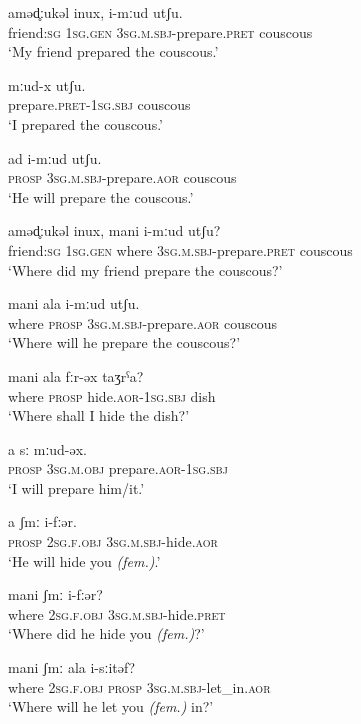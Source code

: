 \documentclass[14pt]{extarticle}
\newcommand{\SG}{\textsc{sg}}
\newcommand{\M}{\textsc{m}}
\newcommand{\F}{\textsc{f}}
\newcommand{\PROSP}{\textsc{prosp}}
\newcommand{\SBJ}{\textsc{sbj}}
\newcommand{\OBJ}{\textsc{obj}}
\newcommand{\GEN}{\textsc{gen}}
\newcommand{\AOR}{\textsc{aor}}
\newcommand{\PRET}{\textsc{pret}}
\begin{document}
\begin{exe}
\ex
\gll aməd̥ːukəl inux, i-mːud utʃu.\\
friend:{\SG} 1{\SG}.{\GEN} 3{\SG}.{\M}.{\SBJ}-prepare.{\PRET} couscous\\
\glt `My friend prepared the couscous.'

\ex
\gll mːud-x utʃu.\\
prepare.{\PRET}-1{\SG}.{\SBJ} couscous\\
\glt `I prepared the couscous.'

\ex
\gll ad i-mːud utʃu.\\
{\PROSP} 3{\SG}.{\M}.{\SBJ}-prepare.{\AOR} couscous\\
\glt `He will prepare the couscous.'

\ex
\gll aməd̥ːukəl inux, mani i-mːud utʃu?\\
friend:{\SG} 1{\SG}.{\GEN} where 3{\SG}.{\M}.{\SBJ}-prepare.{\PRET} couscous\\
\glt `Where did my friend prepare the couscous?'

\ex
\gll mani ala i-mːud utʃu.\\
where {\PROSP} 3{\SG}.{\M}.{\SBJ}-prepare.{\AOR} couscous\\
\glt `Where will he prepare the couscous?'

\ex
\gll mani ala fːr-əx taʒrˁa?\\
where {\PROSP} hide.{\AOR}-1{\SG}.{\SBJ} dish\\
\glt `Where shall I hide the dish?'

\ex
\gll a sː mːud-əx.\\
{\PROSP} 3{\SG}.{\M}.{\OBJ} prepare.{\AOR}-1{\SG}.{\SBJ}\\
\glt `I will prepare him/it.'

\ex
\gll a ʃmː i-fːər.\\
{\PROSP} 2{\SG}.{\F}.{\OBJ} 3{\SG}.{\M}.{\SBJ}-hide.{\AOR}\\
\glt `He will hide you \textit{(fem.)}.'

\ex
\gll mani ʃmː i-fːər?\\
where 2{\SG}.{\F}.{\OBJ} 3{\SG}.{\M}.{\SBJ}-hide.{\PRET}\\
\glt `Where did he hide you \textit{(fem.)}?'

\ex
\gll mani ʃmː ala i-sːitəf?\\
where 2{\SG}.{\F}.{\OBJ} {\PROSP} 3{\SG}.{\M}.{\SBJ}-let\_in.{\AOR}\\
\glt `Where will he let you \textit{(fem.)} in?'

\clearpage


\end{exe}
\end{document}

